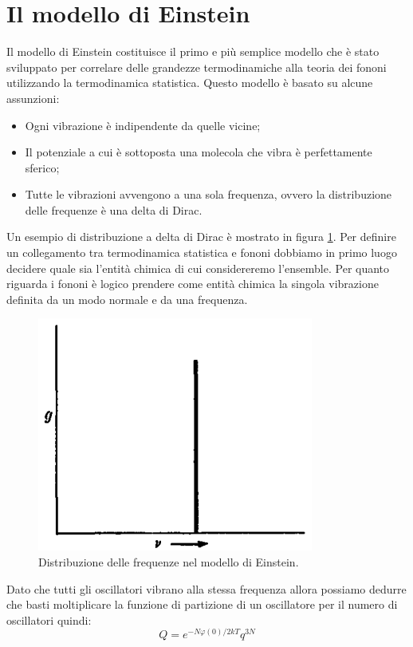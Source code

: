 \documentclass[oneside]{amsbook}
\numberwithin{section}{chapter}
\numberwithin{equation}{section}
\numberwithin{figure}{section}
\begin{document}
\section{Il modello di Einstein}
Il modello di Einstein costituisce il primo e più semplice modello che è stato sviluppato per correlare delle grandezze termodinamiche alla teoria dei fononi utilizzando la termodinamica statistica. Questo modello è basato su alcune assunzioni:
\begin{itemize}
\item Ogni vibrazione è indipendente da quelle vicine;
\item Il potenziale a cui è sottoposta una molecola che vibra è perfettamente sferico;
\item Tutte le vibrazioni avvengono a una sola frequenza, ovvero la distribuzione delle frequenze è una delta di Dirac.
\end{itemize}
Un esempio di distribuzione a delta di Dirac è mostrato in figura \ref{AA4}.
Per definire un collegamento tra termodinamica statistica e fononi dobbiamo in primo luogo decidere quale sia l'entità chimica di cui considereremo l'ensemble. Per quanto riguarda i fononi è logico prendere come entità chimica la singola vibrazione definita da un modo normale e da una frequenza.
\begin{figure}
\centering
\caption{Distribuzione delle frequenze nel modello di Einstein.}\label{AA4}
\includegraphics[scale=0.5]{dirac}
\end{figure}
Dato che tutti gli oscillatori vibrano alla stessa frequenza allora possiamo dedurre che basti moltiplicare la funzione di partizione di un oscillatore per il numero di oscillatori quindi:
\begin{equation}
Q=e^{-N\varphi(0)/2kT}q^{3N} 
\end{equation}
\end{document}
